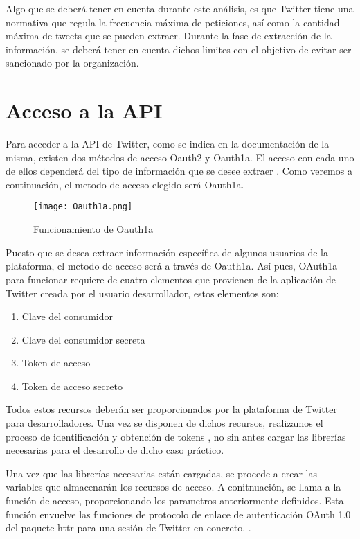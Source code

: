 Algo que se deberá tener en cuenta durante este análisis, es que Twitter tiene una normativa que regula 
la frecuencia máxima de peticiones, así como la cantidad máxima de tweets que se pueden extraer. Durante 
la fase de extracción de la información, se deberá tener en cuenta dichos limites con el objetivo de 
evitar ser sancionado por la organización.

\section{Acceso a la API}
\label{sec:acceso-api}

Para acceder a la API de Twitter, como se indica en la documentación de la misma, existen dos métodos de 
acceso Oauth2 y Oauth1a. El acceso con cada uno de ellos dependerá del tipo de información que se desee 
extraer \cite{oauth1a}. Como veremos a continuación, el metodo de acceso elegido será Oauth1a.

\begin{figure}[tphb]
  		   \centering
     		   \texttt{[image: Oauth1a.png]}
  		   \caption{Funcionamiento de Oauth1a}
  		   \label{img:oauth1a}
\end{figure}

Puesto que se desea extraer información específica de algunos usuarios de la plataforma, el metodo de 
acceso será a través de Oauth1a. Así pues, OAuth1a para funcionar requiere 
de cuatro elementos que provienen de la aplicación de Twitter creada por el usuario desarrollador, estos elementos son:

\begin{enumerate}
	\item Clave del consumidor
	\item Clave del consumidor secreta
	\item Token de acceso
	\item Token de acceso secreto
\end{enumerate}


Todos estos recursos deberán ser proporcionados por la plataforma de Twitter para desarrolladores. Una 
vez se disponen de dichos recursos, realizamos el proceso de identificación y obtención de tokens \cite{error_oauth1a}, 
no sin antes cargar las librerías necesarias para el desarrollo de dicho caso práctico.



Una vez que las librerías necesarias están cargadas, se procede a crear las variables que almacenarán los 
recursos de acceso. A conitnuación, se llama a la función de acceso, proporcionando los parametros anteriormente definidos.
Esta función envuelve las funciones de protocolo de enlace de autenticación OAuth 1.0 del paquete httr para una sesión de Twitter 
en concreto. \cite{create_token}.

